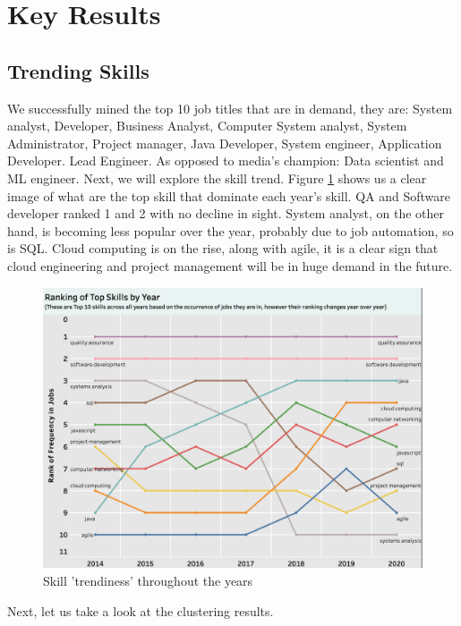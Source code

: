 \section{Key Results}
\subsection{Trending Skills}
We successfully  mined the top 10 job titles that are in demand, they are: System analyst, Developer, Business Analyst, Computer System analyst, System Administrator, Project manager, Java Developer, System engineer, Application Developer. Lead Engineer. As opposed to media's champion: Data scientist and ML engineer. Next, we will explore the skill trend. Figure \ref{trending} shows us a clear image of what are the top skill that dominate each year's skill. QA and Software developer ranked 1 and 2 with no decline in sight. System analyst, on the other hand, is  becoming less popular over the year, probably due to job automation, so is SQL. Cloud computing is on the rise, along with agile, it is a clear sign that cloud engineering and project management will be in huge demand in the future. 
\begin{figure}[h]
	\begin{center}
		\includegraphics[width=\linewidth]{./photos/top10 ranking.png}
	\end{center}
	\caption{Skill 'trendiness' throughout the years}
	\label{trending}
\end{figure}
Next, let us take a look at the clustering results. 
